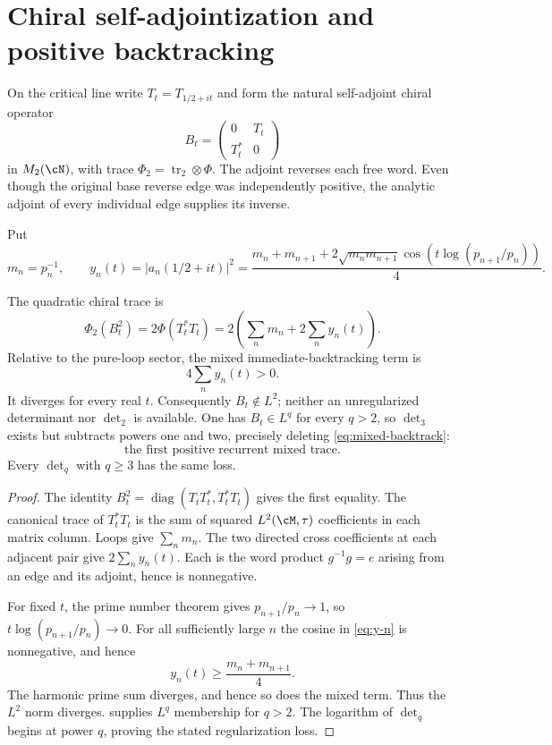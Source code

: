 \section{Chiral self-adjointization and positive backtracking}
\label{sec:chiral}

On the critical line write $T_t=T_{1/2+it}$ and form the natural
self-adjoint chiral operator
\[
 B_t=\begin{pmatrix}0&T_t\\T_t^*&0\end{pmatrix}                \tag{5.1}
\]
in $M_2(\cN)$, with trace $\Phi_2=\operatorname{tr}_2\otimes\Phi$.
The adjoint reverses each free word.  Even though the original base reverse
edge was independently positive, the analytic adjoint of every individual
edge supplies its inverse.

Put
\[
 m_n=p_n^{-1},
 \qquad
 y_n(t)=|a_n(1/2+it)|^2
 =\frac{m_n+m_{n+1}+2\sqrt{m_nm_{n+1}}
 \cos(t\log(p_{n+1}/p_n))}{4}.               \tag{5.2}\label{eq:y-n}
\]

\begin{theorem}
\label{thm:backtrack}
The quadratic chiral trace is
\[
 \Phi_2(B_t^2)
 =2\Phi(T_t^*T_t)
 =2\left(\sum_nm_n+2\sum_ny_n(t)\right).    \tag{5.3}
\]
Relative to the pure-loop sector, the mixed immediate-backtracking term is
\[
 4\sum_ny_n(t)>0.                            \tag{5.4}
\]
It diverges for every real $t$.  Consequently $B_t\notin L^2$; neither an
unregularized determinant nor $\det_2$ is available.  One has
$B_t\in L^q$ for every $q>2$, so $\det_3$ exists but subtracts powers one and
two, precisely deleting \cref{eq:mixed-backtrack}:
\begin{equation}
 \text{the first positive recurrent mixed trace.}
 \label{eq:mixed-backtrack}
\end{equation}
Every $\det_q$ with $q\ge3$ has the same loss.
\end{theorem}

\begin{proof}
The identity $B_t^2=\operatorname{diag}(T_tT_t^*,T_t^*T_t)$ gives the first
equality.  The canonical trace of $T_t^*T_t$ is the sum of squared
$L^2(\cM,\tau)$ coefficients in each matrix column.  Loops give
$\sum_nm_n$.  The two directed cross coefficients at each adjacent pair
give $2\sum_ny_n(t)$.  Each is the word product $g^{-1}g=e$ arising from an
edge and its adjoint, hence is nonnegative.

For fixed $t$, the prime number theorem gives
$p_{n+1}/p_n\to1$, so
$t\log(p_{n+1}/p_n)\to0$.  For all sufficiently large $n$ the cosine in
\cref{eq:y-n} is nonnegative, and hence
\begin{equation}
 y_n(t)\ge\frac{m_n+m_{n+1}}4.
 \label{eq:yn}
\end{equation}
The harmonic prime sum diverges, and hence so does the mixed term.  Thus the
$L^2$ norm diverges.   supplies $L^q$ membership for
$q>2$.  The logarithm of $\det_q$ begins at power $q$, proving the stated
regularization loss.
\end{proof}

